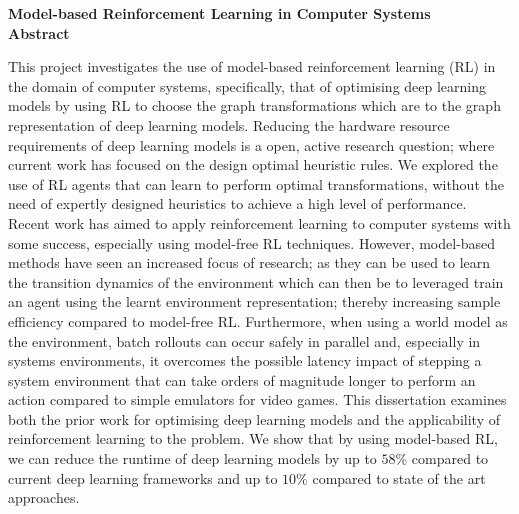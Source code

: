 \newpage
{\textbf{Model-based Reinforcement Learning in Computer Systems}}\\

{\Huge \bf Abstract}
\vspace{24pt} 

This project investigates the use of model-based reinforcement learning (RL) in the domain of computer systems, specifically, that of optimising deep learning models by using RL to choose the graph transformations which are to the graph representation of deep learning models. Reducing the hardware resource requirements of deep learning models is a open, active research question; where current work has focused on the design optimal heuristic rules. We explored the use of RL agents that can learn to perform optimal transformations, without the need of expertly designed heuristics to achieve a high level of performance. Recent work has aimed to apply reinforcement learning to computer systems with some success, especially using model-free RL techniques. However, model-based methods have seen an increased focus of research; as they can be used to learn the transition dynamics of the environment which can then be to leveraged train an agent using the learnt environment representation; thereby increasing sample efficiency compared to model-free RL. Furthermore, when using a world model as the environment, batch rollouts can occur safely in parallel and, especially in systems environments, it overcomes the possible latency impact of stepping a system environment that can take orders of magnitude longer to perform an action compared to simple emulators for video games. This dissertation examines both the prior work for optimising deep learning models and the applicability of reinforcement learning to the problem. We show that by using model-based RL, we can reduce the runtime of deep learning models by up to $58\%$ compared to current deep learning frameworks and up to $10\%$ compared to state of the art approaches.

\vspace*{\fill}
